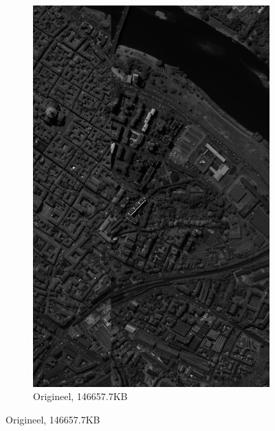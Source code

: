 \begin{figure}[]
\centering
\begin{subfigure}{\textwidth}
  \centering
  \includegraphics[width=0.85\linewidth]{images/pavia_sum.png}
  \caption{Origineel, 146657.7KB}
\end{subfigure}
\end{figure}
